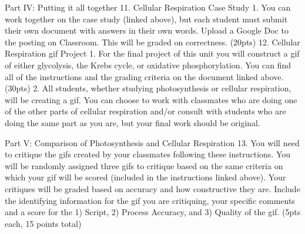Part IV: Putting it all together
11. Cellular Respiration Case Study
   1. You can work together on the case study (linked above), but each student must submit their own document with answers in their own words. Upload a Google Doc to the posting on Classroom. This will be graded on correctness. (20pts)
12. Cellular Respiration gif Project
   1. For the final project of this unit you will construct a gif of either glycolysis, the Krebs cycle, or oxidative phosphorylation. You can find all of the instructions and the grading criteria on the document linked above. (30pts)
   2. All students, whether studying photosynthesis or cellular respiration, will be creating a gif. You can choose to work with classmates who are doing one of the other parts of cellular respiration and/or consult with students who are doing the same part as you are, but your final work should be original.




Part V: Comparison of Photosynthesis and Cellular Respiration
13. You will need to critique the gifs created by your classmates following these instructions. You will be randomly assigned three gifs to critique based on the same criteria on which your gif will be scored (included in the instructions linked above). Your critiques will be graded based on accuracy and how constructive they are. Include the identifying information for the gif you are critiquing, your specific comments and a score for the 1) Script, 2) Process Accuracy, and 3) Quality of the gif. (5pts each, 15 points total)


